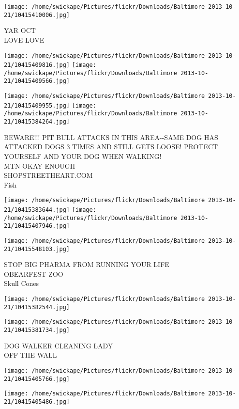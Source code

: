 \documentclass[10pt,letterpaper]{article}
\begin{document}
\vspace{0.25in}
\texttt{[image: /home/swickape/Pictures/flickr/Downloads/Baltimore 2013-10-21/10415410006.jpg]}

YAR OCT\\
LOVE LOVE
\pagebreak

\texttt{[image: /home/swickape/Pictures/flickr/Downloads/Baltimore 2013-10-21/10415409816.jpg]}
\texttt{[image: /home/swickape/Pictures/flickr/Downloads/Baltimore 2013-10-21/10415409566.jpg]}

\texttt{[image: /home/swickape/Pictures/flickr/Downloads/Baltimore 2013-10-21/10415409955.jpg]}
\texttt{[image: /home/swickape/Pictures/flickr/Downloads/Baltimore 2013-10-21/10415384264.jpg]}

BEWARE!!! PIT BULL ATTACKS IN THIS AREA{-}{-}SAME DOG HAS ATTACKED DOGS 3 TIMES AND STILL GETS LOOSE! PROTECT YOURSELF AND YOUR DOG WHEN WALKING!\\
MTN OKAY ENOUGH\\
SHOPSTREETHEART.COM\\
Fish
\pagebreak

\texttt{[image: /home/swickape/Pictures/flickr/Downloads/Baltimore 2013-10-21/10415383644.jpg]}
\texttt{[image: /home/swickape/Pictures/flickr/Downloads/Baltimore 2013-10-21/10415407946.jpg]}

\texttt{[image: /home/swickape/Pictures/flickr/Downloads/Baltimore 2013-10-21/10415548103.jpg]}

STOP BIG PHARMA FROM RUNNING YOUR LIFE\\
OBEARFEST ZOO\\
Skull Cones
\pagebreak

\texttt{[image: /home/swickape/Pictures/flickr/Downloads/Baltimore 2013-10-21/10415382544.jpg]}

\vspace{0.25in}
\texttt{[image: /home/swickape/Pictures/flickr/Downloads/Baltimore 2013-10-21/10415381734.jpg]}

DOG WALKER CLEANING LADY\\
OFF THE WALL
\pagebreak

\texttt{[image: /home/swickape/Pictures/flickr/Downloads/Baltimore 2013-10-21/10415405766.jpg]}

\vspace{0.25in}
\texttt{[image: /home/swickape/Pictures/flickr/Downloads/Baltimore 2013-10-21/10415405486.jpg]}
\end{document}
